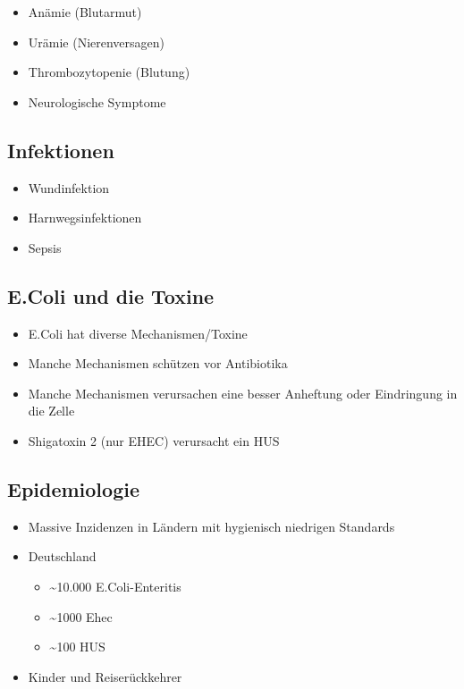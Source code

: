 \documentclass[
]{article}
\providecommand{\tightlist}{%
  \setlength{\itemsep}{0pt}\setlength{\parskip}{0pt}}
\begin{document}
\begin{itemize}
\tightlist
\item
  Anämie (Blutarmut)
\item
  Urämie (Nierenversagen)
\item
  Thrombozytopenie (Blutung)
\item
  Neurologische Symptome
\end{itemize}

\hypertarget{infektionen}{%
\subsection{Infektionen}\label{infektionen}}

\begin{itemize}
\tightlist
\item
  Wundinfektion
\item
  Harnwegsinfektionen
\item
  Sepsis
\end{itemize}

\hypertarget{e.coli-und-die-toxine}{%
\subsection{E.Coli und die Toxine}\label{e.coli-und-die-toxine}}

\begin{itemize}
\tightlist
\item
  E.Coli hat diverse Mechanismen/Toxine
\item
  Manche Mechanismen schützen vor Antibiotika
\item
  Manche Mechanismen verursachen eine besser Anheftung oder Eindringung
  in die Zelle
\item
  Shigatoxin 2 (nur EHEC) verursacht ein HUS
\end{itemize}

\hypertarget{epidemiologie}{%
\subsection{Epidemiologie}\label{epidemiologie}}

\begin{itemize}
\tightlist
\item
  Massive Inzidenzen in Ländern mit hygienisch niedrigen Standards
\item
  Deutschland

  \begin{itemize}
  \tightlist
  \item
    \textasciitilde10.000 E.Coli-Enteritis
  \item
    \textasciitilde1000 Ehec
  \item
    \textasciitilde100 HUS
  \end{itemize}
\item
  Kinder und Reiserückkehrer
\end{itemize}
\end{document}
